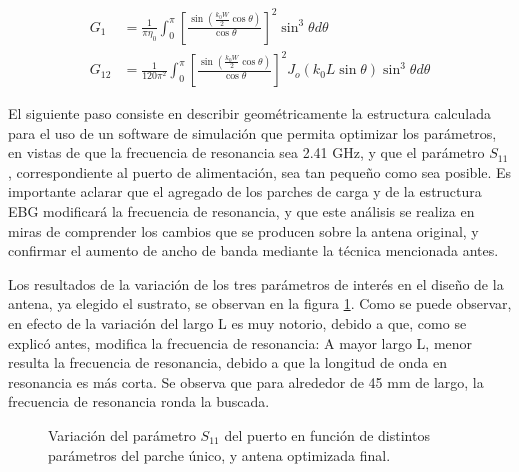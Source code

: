 \begin{align}
	\label{eq:conductancia-microstrip-balanis}
	G_1 &= \frac{1}{\pi \eta_0} \int_0^\pi \left[ \frac{\sin \left( \frac{k_0 W}{2} \cos \theta \right) }{\cos \theta}\right]^2 \sin^3 \theta d\theta \\
	G_{12} &= \frac{1}{120 \pi^2} \int_0^{\pi} \left[ \frac{\sin \left( \frac{k_0 W}{2} \cos \theta \right) }{\cos \theta}\right]^2 J_o(k_0 L \sin \theta) \sin^3 \theta d\theta
\end{align}

El siguiente paso consiste en describir geométricamente la estructura calculada para el uso de un software de simulación que permita optimizar los parámetros, en vistas de que la frecuencia de resonancia sea 2.41 GHz, y que el parámetro $S_{11}$, correspondiente al puerto de alimentación, sea tan pequeño como sea posible. Es importante aclarar que el agregado de los parches de carga y de la estructura EBG modificará la frecuencia de resonancia, y que este análisis se realiza en miras de comprender los cambios que se producen sobre la antena original, y confirmar el aumento de ancho de banda mediante la técnica mencionada antes.

Los resultados de la variación de los tres parámetros de interés en el diseño de la antena, ya elegido el sustrato, se observan en la figura \ref{fig:simulaciones-microstrip-1parche}. Como se puede observar, en efecto de la variación del largo L es muy notorio, debido a que, como se explicó antes, modifica la frecuencia de resonancia: A mayor largo L, menor resulta la frecuencia de resonancia, debido a que la longitud de onda en resonancia es más corta. Se observa que para alrededor de 45 mm de largo, la frecuencia de resonancia ronda la buscada.

\begin{figure}[H]
	\centering 
	\hspace{19pt}
	\caption{Variación del parámetro $S_{11}$ del puerto en función de distintos parámetros del parche único, y antena optimizada final.}
	\label{fig:simulaciones-microstrip-1parche}
\end{figure}

